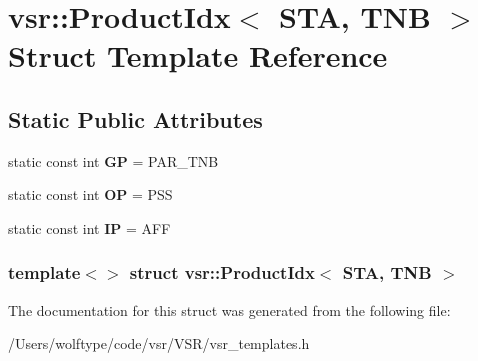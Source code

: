 \hypertarget{structvsr_1_1_product_idx_3_01_s_t_a_00_01_t_n_b_01_4}{\section{vsr\-:\-:Product\-Idx$<$ S\-T\-A, T\-N\-B $>$ Struct Template Reference}
\label{structvsr_1_1_product_idx_3_01_s_t_a_00_01_t_n_b_01_4}
}
\subsection*{Static Public Attributes}
\begin{DoxyCompactItemize}
\item 
\hypertarget{structvsr_1_1_product_idx_3_01_s_t_a_00_01_t_n_b_01_4_a098ab733ff85a7f2a318b574f02b8e57}{static const int {\bfseries G\-P} = P\-A\-R\-\_\-\-T\-N\-B}\label{structvsr_1_1_product_idx_3_01_s_t_a_00_01_t_n_b_01_4_a098ab733ff85a7f2a318b574f02b8e57}

\item 
\hypertarget{structvsr_1_1_product_idx_3_01_s_t_a_00_01_t_n_b_01_4_a74c957c7e64ac0debd69dd84591b2709}{static const int {\bfseries O\-P} = P\-S\-S}\label{structvsr_1_1_product_idx_3_01_s_t_a_00_01_t_n_b_01_4_a74c957c7e64ac0debd69dd84591b2709}

\item 
\hypertarget{structvsr_1_1_product_idx_3_01_s_t_a_00_01_t_n_b_01_4_a7606bd3534a15d11582e68b4557b5b77}{static const int {\bfseries I\-P} = A\-F\-F}\label{structvsr_1_1_product_idx_3_01_s_t_a_00_01_t_n_b_01_4_a7606bd3534a15d11582e68b4557b5b77}

\end{DoxyCompactItemize}
\subsubsection*{template$<$$>$ struct vsr\-::\-Product\-Idx$<$ S\-T\-A, T\-N\-B $>$}



The documentation for this struct was generated from the following file\-:\begin{DoxyCompactItemize}
\item 
/\-Users/wolftype/code/vsr/\-V\-S\-R/vsr\-\_\-templates.\-h\end{DoxyCompactItemize}
